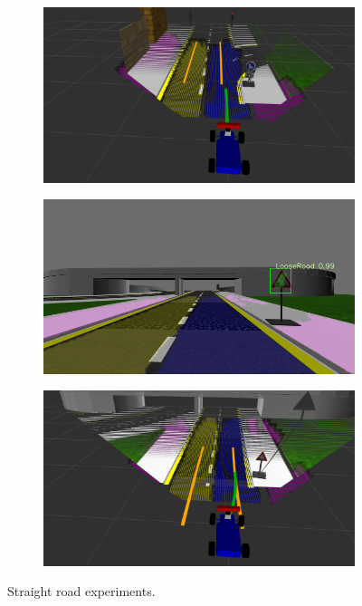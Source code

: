 \begin{figure}[h]
\begin{subfigure}[b]{0.45\linewidth}
  \end{subfigure}
  \begin{subfigure}[b]{0.45\linewidth}
    \includegraphics[width=\linewidth]{figures/experiments/straight-or-right-pc.png}
  \end{subfigure}
  \begin{subfigure}[b]{0.45\linewidth}
    \includegraphics[width=\linewidth]{figures/experiments/loose-road-img.png}
  \end{subfigure}
  \begin{subfigure}[b]{0.45\linewidth}
    \includegraphics[width=\linewidth]{figures/experiments/loose-road-pc.png}
  \end{subfigure}
  \caption{Straight road experiments.}
  \label{figure:normal-driving}
\end{figure}

